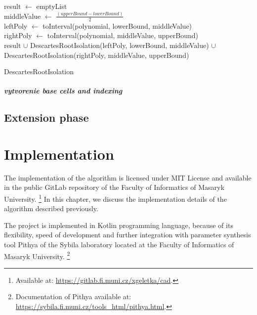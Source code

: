 \documentclass[
  digital, %
  twoside, %
  table,   %
  nolof,     %
  nolot,     %
]{fithesis3}
\begin{document}
\begin{algorithm}[H]
    
 result $\gets$ emptyList\\
 middleValue $\gets$ $\frac{(upperBound - lowerBound)}{2}$\\
 leftPoly $\gets$ toInterval(polynomial, lowerBound, middleValue)\\
 rightPoly $\gets$ toInterval(polynomial, middleValue, upperBound)\\
 \Return result $\cup$
 \newline
 DescartesRootIsolation(leftPoly, lowerBound, middleValue) $\cup$
 \newline
 DescartesRootIsolation(rightPoly, middleValue, upperBound)
 \caption{DescartesRootIsolation}
\end{algorithm}

\paragraph{
vytvorenie base cells and indexing
}
\section{Extension phase}

\chapter{Implementation}
The implementation of the algorithm is licensed under MIT License and available in the public GitLab repository of the Faculty of Informatics of Masaryk University. \footnote{
  Available at: \url{https://gitlab.fi.muni.cz/xgeletka/cad}.
} In this chapter, we discuss the implementation details of
the algorithm described previously.

The project is implemented in Kotlin programming language, because of its flexibility, speed of development and further integration with parameter synthesis tool Pithya of the Sybila laboratory located at the Faculty of Informatics of Masaryk University. \footnote{
  Documentation of Pithya available at: \url{https://sybila.fi.muni.cz/tools_html/pithya.html}.
}
\end{document}
